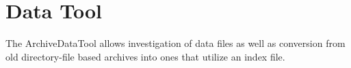 \section{Data Tool}
The ArchiveDataTool allows investigation of data files as well as conversion from old directory-file based archives into ones that utilize an index file.
